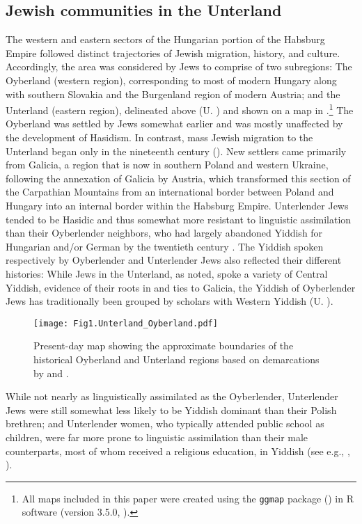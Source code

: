 \documentclass[output=paper,colorlinks,citecolor=brown]{langscibook}
\begin{document}
\subsection{Jewish communities in the Unterland}
\label{sec:nove:3.2}
The western and eastern sectors of the Hungarian portion of the Habsburg Empire followed distinct trajectories of Jewish migration, history, and culture. Accordingly, the area was considered by Jews to comprise of two subregions: The Oyberland (western region), corresponding to most of modern Hungary along with southern Slovakia and the Burgenland region of modern Austria; and the Unterland (eastern region), delineated above (U. \citealt{Weinreich1964,Krogh2012}) and shown on a map in .\footnote{ {All maps included in this paper were created using the \texttt{ggmap} package} {(\citealt{KahleWickham2013})} {in R software (version 3.5.0, \citealt{Team2021}).}} The Oyberland was settled by Jews somewhat earlier and was mostly unaffected by the development of Hasidism. In contrast, mass Jewish migration to the Unterland began only in the nineteenth century (\citealt{Keren-Kratz2019,Cooper2019,Jelinek2007}). New settlers came primarily from Galicia, a region that is now in southern Poland and western Ukraine, following the annexation of Galicia by Austria, which transformed this section of the Carpathian Mountains from an international border between Poland and Hungary into an internal border within the Habsburg Empire. Unterlender Jews tended to be Hasidic and thus somewhat more resistant to linguistic assimilation than their Oyberlender neighbors, who had largely abandoned Yiddish for Hungarian and/or German by the twentieth century \citep{Komoróczy2018}. The Yiddish spoken respectively by Oyberlender and Unterlender Jews also reflected their different histories: While Jews in the Unterland, as noted, spoke a variety of Central Yiddish, evidence of their roots in and ties to Galicia, the Yiddish of Oyberlender Jews has traditionally been grouped by scholars with Western Yiddish (U. \citealt{Weinreich1964}).

\begin{figure}
\texttt{[image: Fig1.Unterland\_Oyberland.pdf]}
\caption{\label{fig:nove:1} Present-day map showing the approximate boundaries of the historical Oyberland and Unterland regions based on demarcations by \citet{Krogh2012} and \citet{Weinreich1964}.}
\end{figure}

While not nearly as linguistically assimilated as the Oyberlender, Unterlender Jews were still somewhat less likely to be Yiddish dominant than their Polish brethren; and Unterlender women, who typically attended public school as children, were far more prone to linguistic assimilation than their male counterparts, most of whom received a religious education, in Yiddish (see e.g., \citealt[152]{Rubin1972}, \citealt[12]{Jelinek2007}).
\end{document}
